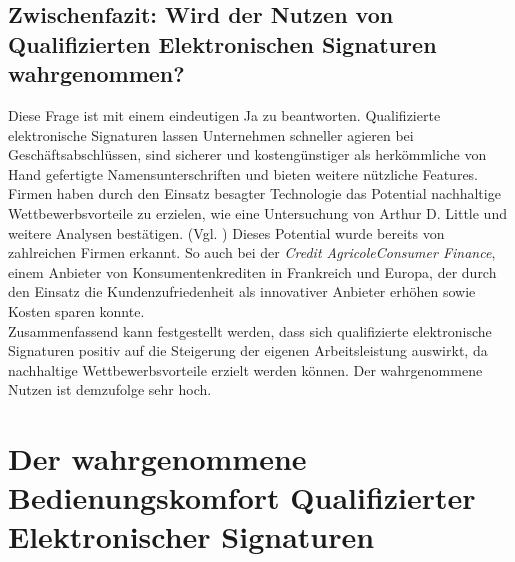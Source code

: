 \documentclass[deutsch]{lib/llncs/llncs}
\begin{document}
\subsection{Zwischenfazit: Wird der Nutzen von Qualifizierten Elektronischen Signaturen wahrgenommen?}
Diese Frage ist mit einem eindeutigen Ja zu beantworten. Qualifizierte elektronische Signaturen lassen Unternehmen schneller agieren bei Geschäftsabschlüssen, sind sicherer und kostengünstiger als herkömmliche von Hand gefertigte Namensunterschriften und bieten weitere nützliche Features. \\
Firmen haben durch den Einsatz besagter Technologie das Potential nachhaltige Wettbewerbsvorteile zu erzielen, wie eine Untersuchung von Arthur D. Little und weitere Analysen bestätigen. (Vgl. \cite[S. 7]{Zitat05})
Dieses Potential wurde bereits von zahlreichen Firmen erkannt. So auch bei der \textit{Credit AgricoleConsumer Finance}, einem Anbieter von Konsumentenkrediten in Frankreich und Europa, der durch den Einsatz die Kundenzufriedenheit als innovativer Anbieter erhöhen sowie Kosten sparen konnte. \cite[S. 13]{Zitat05} \\
Zusammenfassend kann festgestellt werden, dass sich qualifizierte elektronische Signaturen positiv auf die Steigerung der eigenen Arbeitsleistung auswirkt, da nachhaltige Wettbewerbsvorteile erzielt werden können. Der wahrgenommene Nutzen ist demzufolge sehr hoch. 


\section{Der wahrgenommene Bedienungskomfort Qualifizierter Elektronischer Signaturen}
\end{document}
